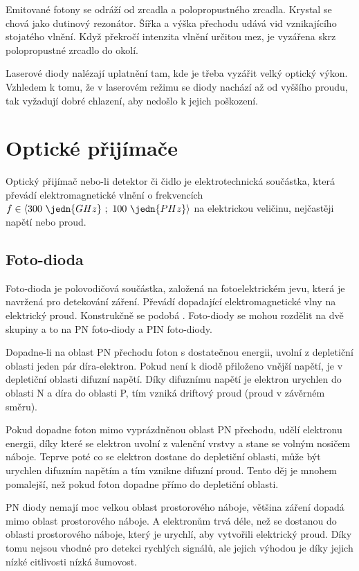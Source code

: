 Emitované fotony se odráží od zrcadla a polopropustného zrcadla.  Krystal se chová jako dutinový rezonátor. Šířka a výška přechodu udává vid vznikajícího stojatého vlnění. Když překročí intenzita vlnění určitou mez, je vyzářena skrz polopropustné zrcadlo do okolí.

Laserové diody nalézají uplatnění tam, kde je třeba vyzářit velký optický výkon. Vzhledem k tomu, že v laserovém režimu se diody nachází až od vyššího proudu, tak vyžadují dobré chlazení, aby nedošlo k jejich poškození.

\section{Optické přijímače}
Optický přijímač nebo-li detektor či čidlo je elektrotechnická součástka, která převádí elektromagnetické vlnění o frekvencích $f \in \langle 300~\jedn{GHz}~;~100~\jedn{PHz} \rangle$ na elektrickou veličinu, nejčastěji napětí nebo proud.

\subsection{Foto-dioda}
Foto-dioda je polovodičová součástka, založená na fotoelektrickém jevu, která je navržená pro detekování záření. Převádí dopadající elektromagnetické vlny na elektrický proud. Konstrukčně se podobá . Foto-diody se
mohou rozdělit na dvě skupiny a to na PN foto-diody a PIN foto-diody.

Dopadne-li na oblast PN přechodu foton s dostatečnou energii, uvolní z depletiční oblasti jeden pár díra-elektron. Pokud není k diodě přiloženo vnější napětí, je v depletiční oblasti difuzní napětí. Díky difuznímu napětí je elektron urychlen do oblasti N a díra do oblasti P, tím vzniká driftový proud (proud v závěrném směru).

Pokud dopadne foton mimo vyprázdněnou oblast PN přechodu, udělí elektronu energii, díky které se elektron uvolní z valenční vrstvy a stane se volným nosičem náboje. Teprve poté co se elektron dostane do depletiční oblasti, může být urychlen difuzním napětím a tím vznikne difuzní proud. Tento děj je mnohem pomalejší, než pokud foton dopadne přímo do depletiční oblasti.

PN diody nemají moc velkou oblast prostorového náboje, většina záření dopadá mimo oblast prostorového náboje. A elektronům trvá déle, než se dostanou do oblasti prostorového náboje, který je urychlí, aby vytvořili elektrický proud. Díky tomu nejsou vhodné pro detekci rychlých signálů, ale jejich výhodou je díky jejich nízké citlivosti nízká šumovost.

